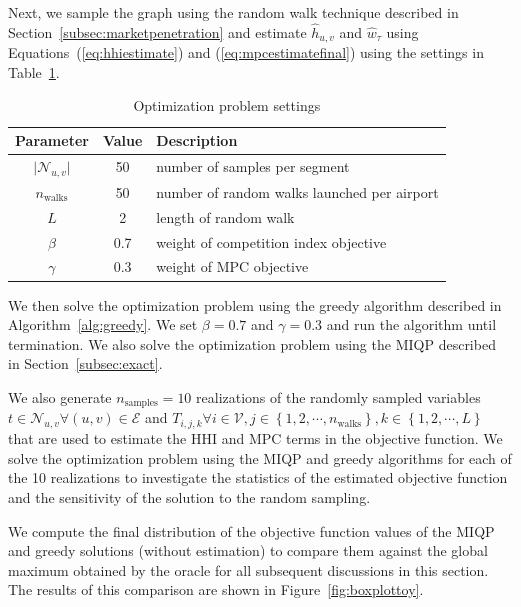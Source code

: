 \documentclass[preprint,times]{elsarticle}
\def\mkhalil#1{{\color{black} #1}}
\begin{document}
Next, we sample the graph using the random walk technique described in Section~\ref{subsec:marketpenetration} and estimate $\hat{h}_{u,v}$ and $\hat{w}_{\tau}$ using Equations~(\ref{eq:hhiestimate}) and (\ref{eq:mpcestimatefinal}) using the settings in Table~\ref{table:toyproblemsettings}.
%
\begin{table}[H]
\centering
\caption{Optimization problem settings}
\begin{tabular}{|c|c|l|}
\hline
\textbf{Parameter} & \textbf{Value} & \textbf{Description}\\
\hline
$\lvert\mathcal{N}_{u,v}\rvert$ & 50 & number of samples per \mkhalil{segment} \\
$n_\text{walks}$ & 50 & number of random walks launched per \mkhalil{airport} \\
$L$ & 2 & length of random walk \\
$\beta$ & 0.7 & weight of competition index objective \\
$\gamma$ & 0.3 & weight of \ac{MPC} objective \\
\hline
\end{tabular}
\label{table:toyproblemsettings}
\end{table}
%
We then solve the optimization problem using the greedy algorithm described in Algorithm~\ref{alg:greedy}. We set $\beta=0.7$ and $\gamma=0.3$ and run the algorithm until termination. We also solve the optimization problem using the \ac{MIQP} described in Section~\ref{subsec:exact}.

We also generate $n_\text{samples}=10$ realizations of the randomly sampled variables $t\in\mathcal{N}_{u,v} \forall (u,v)\in\mathcal{E}$ and $T_{i,j,k} \forall i\in\mathcal{V}, j\in\left\{1,2,\cdots,n_\text{walks}\right\}, k\in\left\{1,2,\cdots,L\right\}$ that are used to estimate the \ac{HHI} and \ac{MPC} terms in the objective function. We solve the optimization problem using the \ac{MIQP} and greedy algorithms for each of the 10 realizations to investigate the statistics of the estimated objective function and the sensitivity of the solution to the random sampling.

We compute the final distribution of the objective function values of the \ac{MIQP} and greedy solutions (without estimation) to compare them against the global maximum obtained by the oracle for all subsequent discussions in this section. The results of this comparison are shown in Figure~\ref{fig:boxplottoy}.
\end{document}
